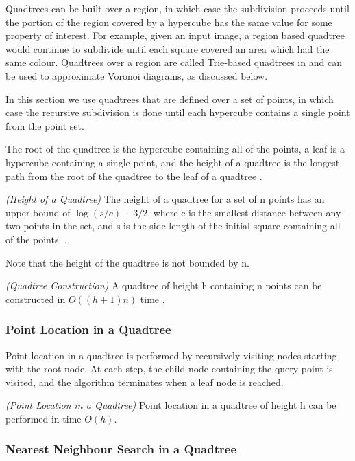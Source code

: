 \documentclass[mcs]{scsthesis}
\begin{document}
Quadtrees can be built over a region, in which case the subdivision proceeds
until the portion of the region covered by a hypercube has the same value for
some property of interest. For example, given an input image, a region based
quadtree would continue to subdivide until each square covered an area which
had the same colour. Quadtrees over a region are called Trie-based quadtrees in
\cite{samet} and can be used to approximate Voronoi diagrams, as discussed
below.

In this section we use quadtrees that are defined over a set of points, in which
case the recursive subdivision is done until each hypercube contains a single
point from the point set.

The root of the quadtree is the hypercube containing all of the points, a leaf
is a hypercube containing a single point, and the height of a quadtree
is the longest path from the root of the quadtree to the leaf of a quadtree
\cite{dutch}.

\begin{thm} \emph{(Height of a Quadtree)}
The height of a quadtree for a set of n points has an upper bound of \(\log(s/c)
+ 3/2\), where c is the smallest distance between any two points in the set, and
s is the side length of the initial square containing all of the points.
\cite{dutch}.
\end{thm}

Note that the height of the quadtree is not bounded by n.

\begin{thm} \emph{(Quadtree Construction)}
A quadtree of height h containing n points can be constructed in \(O((h + 1)n)\)
time \cite{dutch}.
\end{thm}

\subsubsection{Point Location in a Quadtree}

Point location in a quadtree is performed by recursively visiting nodes
starting with the root node. At each step, the child node containing the query
point is visited, and the algorithm terminates when a leaf node is reached.

\begin{thm} \emph{(Point Location in a Quadtree)} 
Point location in a quadtree of height h can be performed in time \(O(h)\). 
\end{thm}

\subsubsection{Nearest Neighbour Search in a Quadtree}
\end{document}
